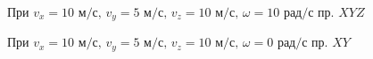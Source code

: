 \documentclass[a5paper, 10pt]{article}
\theoremstyle{definition}
\theoremstyle{plain}
\theoremstyle{remark}
\begin{document}
\begin{figure}[h]
	           \caption{При $v_x = 10 \text{ м/с}, \, v_y = 5  \text{ м/с}, \, v_z = 10  \text{ м/с}, \, \omega = 10 \text{ рад/с}$ пр. $XYZ$}
\end{figure}

\newpage
\begin{figure}[!h]
	           \caption{При $v_x = 10 \text{ м/с}, \, v_y = 5  \text{ м/с}, \, v_z = 10  \text{ м/с}, \, \omega = 0 \text{ рад/с}$ пр. $XY$}
\end{figure}
\end{document}
